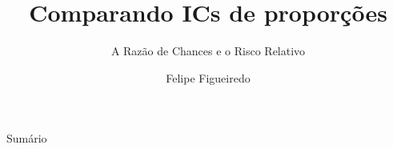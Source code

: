 \documentclass{beamer}
\title%
{Comparando ICs de proporções}
\subtitle
{A Razão de Chances e o Risco Relativo} %
\author%
{Felipe Figueiredo}%
\institute[INTO] %
{Instituto Nacional de Traumatologia e Ortopedia
}
\date%
{}
\begin{document}
\begin{frame}
  \titlepage
\end{frame}

\begin{frame}{Sumário}
  \tableofcontents
\end{frame}







\end{document}
